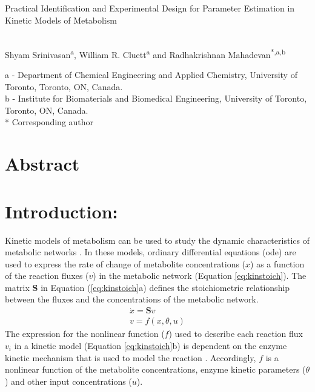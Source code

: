 \documentclass[10pt]{article}
\begin{document}
	\begin{center}
		\begin{Large}
			Practical Identification and Experimental Design for Parameter Estimation in Kinetic Models of Metabolism
		\end{Large}\\
		Shyam Srinivasan\textsuperscript{a}, William R. Cluett\textsuperscript{a} and Radhakrishnan Mahadevan\textsuperscript{*,a,b}\\
	\end{center}
	a - Department of Chemical Engineering and Applied Chemistry, University of Toronto, Toronto, ON, Canada.\\
	b - Institute for Biomaterials and Biomedical Engineering, University of Toronto, Toronto, ON, Canada.\\
	{*} Corresponding author
	\section*{Abstract}
	\section{Introduction:}
	Kinetic models of metabolism can be used to study the dynamic characteristics of metabolic networks \parencite{Bordbar2015, Andreozzi2016}. In these models, ordinary differential equations (ode) are used to express the rate of change of metabolite concentrations ($x$) as a function of the reaction fluxes ($v$) in the metabolic network (Equation \ref{eq:kinstoich}). The matrix $\mathbf{S}$ in Equation (\ref{eq:kinstoich}a) defines the stoichiometric relationship between the fluxes and the concentrations of the metabolic network.
	\begin{subequations}\label{eq:kinstoich}
		\begin{align}
		\dot{x} = \mathbf{S}v\\
		v = f(x, \theta, u)
		\end{align}
	\end{subequations}
	The expression for the nonlinear function ($f$) used to describe each reaction flux $v_i$ in a kinetic model (Equation \ref{eq:kinstoich}b) is dependent on the enzyme kinetic mechanism that is used to model the reaction \parencite{Link2014, Srinivasan2015}. Accordingly, $f$ is a nonlinear function of the metabolite concentrations, enzyme kinetic parameters ($\theta$) and other input concentrations ($u$). 
	
\end{document}
